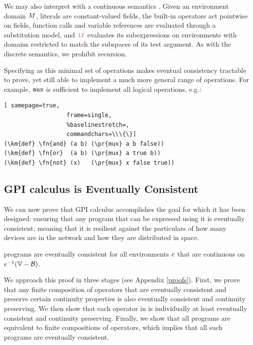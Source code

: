 \documentclass[12pt,a4paper,twoside,openright]{book}
\begin{document}
We may also interpret \calculus{} with a continuous semantics \cite{BealUsbeck12}.
%
Given an environment domain $M$, literals are constant-valued fields, the built-in operators act pointwise on fields, function calls and variable references are evaluated through a substitution model, and $\ifN$ evaluates its subexpressions on environments with domains restricted to match the subspaces of its test argument.
%
As with the discrete semantics, we prohibit recursion.

Specifying \calculus{} as this minimal set of operations makes eventual consistency tractable to prove, yet still able to implement a much more general range of operations.
%
For example, $\texttt{mux}$ is sufficient to implement all logical operations, e.g.:
\begin{Verbatim}[ samepage=true,
                  frame=single,
                  %baselinestretch=,
                  commandchars=\\\{\}]
(\km{def} \fn{and} (a b) (\pr{mux} a b false))
(\km{def} \fn{or}  (a b) (\pr{mux} a true b))
(\km{def} \fn{not} (x)   (\pr{mux} x false true))
\end{Verbatim}

\subsection{GPI calculus is Eventually Consistent}

We can now prove that GPI calculus accomplishes the goal for which it has been designed: ensuring that any program that can be expressed using it is eventually consistent, meaning that it is resilient against the particulars of how many devices are in the network and how they are distributed in space.

\begin{thm}
  \calculus{} programs are eventually consistent for all environments
  $e$ that are continuous on $\validdomain{\environment}$.
\end{thm}

We approach this proof in three stages (see Appendix \ref{proofs}).
%
First, we prove that any finite composition of operators that are eventually consistent and preserve certain continuity properties is also eventually consistent and continuity preserving.
%
We then show that each operator in \calculus{} is individually at least eventually consistent and continuity preserving.  
%
Finally, we show that all \calculus{} programs are equivalent to finite compositions of operators, which implies that all such programs are eventually consistent.
\end{document}
